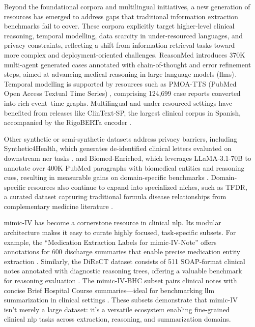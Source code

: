 Beyond the foundational corpora and multilingual initiatives, a new generation of resources has emerged to address gaps that traditional information extraction benchmarks fail to cover. These corpora explicitly target higher-level clinical reasoning, temporal modelling, data scarcity in under-resourced languages, and privacy constraints, reflecting a shift from information retrieval tasks toward more complex and deployment-oriented challenges. ReasonMed \citep{sunReasonMed370KMultiAgent2025} introduces 370K multi-agent generated cases annotated with chain-of-thought and error refinement steps, aimed at advancing medical reasoning in large language models (\glspl{llm}). Temporal modelling is supported by resources such as PMOA-TTS (PubMed Open Access Textual Time Series) \citep{noroozizadehPMOATTSIntroducingPubMed2025}, comprising 124,699 case reports converted into rich event–time graphs. Multilingual and under-resourced settings have benefited from releases like ClinText-SP, the largest clinical corpus in Spanish, accompanied by the RigoBERTa encoder \citep{subiesClinTextSPRigoBERTaClinical2025}.

Other synthetic or semi-synthetic datasets address privacy barriers, including Synthetic4Health, which generates de-identified clinical letters evaluated on downstream \gls{ner} tasks \citep{smithSynthetic4Health2025}, and Biomed-Enriched, which leverages LLaMA-3.1-70B to annotate over 400K PubMed paragraphs with biomedical entities and reasoning cues, resulting in measurable gains on domain-specific benchmarks \citep{touchentBiomedEnrichedBiomedicalDataset2025}. Domain-specific resources also continue to expand into specialized niches, such as TFDR, a curated dataset capturing traditional formula disease relationships from complementary medicine literature \citep{liuTFDRDataset2025}. 

\gls{mimic}-IV has become a cornerstone resource in clinical \gls{nlp}. Its modular architecture \citep{johnson2023mimiciv_SciData} makes it easy to curate highly focused, task-specific subsets. For example, the “Medication Extraction Labels for \gls{mimic}-IV-Note” offers annotations for 600 discharge summaries that enable precise medication entity extraction \citep{goel2023medicationLabels}. Similarly, the DiReCT dataset consists of 511 SOAP-format clinical notes annotated with diagnostic reasoning trees, offering a valuable benchmark for reasoning evaluation \citep{wang2024direct}. The \gls{mimic}-IV-BHC subset pairs clinical notes with concise Brief Hospital Course summaries—ideal for benchmarking \gls{llm} summarization in clinical settings \citep{aali2024mimic_bhc}. These subsets demonstrate that \gls{mimic}-IV isn’t merely a large dataset: it’s a versatile ecosystem enabling fine-grained clinical \gls{nlp} tasks across extraction, reasoning, and summarization domains.

